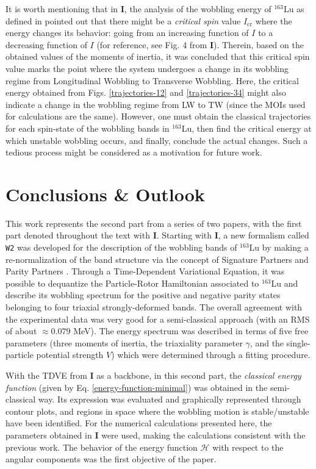 \documentclass[myclassdoc,debug]{rjparticle}
\begin{document}
It is worth mentioning that in \textbf{I}, the analysis of the wobbling energy of $^{163}$Lu as defined in \cite{frauendorf2014transverse} pointed out that there might be a \emph{critical spin} value $I_\text{cr}$ where the energy changes its behavior: going from an increasing function of $I$ to a decreasing function of $I$ (for reference, see Fig. 4 from \textbf{I}). Therein, based on the obtained values of the moments of inertia, it was concluded that this critical spin value marks the point where the system undergoes a change in its wobbling regime from Longitudinal Wobbling to Transverse Wobbling. Here, the critical energy obtained from Figs. \ref{trajectories-12} and \ref{trajectories-34} might also indicate a change in the wobbling regime from LW to TW (since the MOIs used for calculations are the same). However, one must obtain the classical trajectories for each spin-state of the wobbling bands in $^{163}$Lu, then find the critical energy at which unstable wobbling occurs, and finally, conclude the actual changes. Such a tedious process might be considered as a motivation for future work.

\section{Conclusions \& Outlook}
\label{section-gata}

This work represents the second part from a series of two papers, with the first part denoted throughout the text with \textbf{I}. Starting with \textbf{I}, a new formalism called \texttt{W2} was developed for the description of the wobbling bands of $^{163}$Lu by making a re-normalization of the band structure via the concept of Signature Partners and Parity Partners  \cite{poenaru2021parity}. Through a Time-Dependent Variational Equation, it was possible to dequantize the Particle-Rotor Hamiltonian associated to $^{163}$Lu and describe its wobbling spectrum for the positive and negative parity states belonging to four triaxial strongly-deformed bands. The overall agreement with the experimental data was very good for a semi-classical approach (with an RMS of about $\approx0.079$ MeV). The energy spectrum was described in terms of five free parameters (three moments of inertia, the triaxiality parameter $\gamma$, and the single-particle potential strength $V$) which were determined through a fitting procedure. 

With the TDVE from \textbf{I} as a backbone, in this second part, the \emph{classical energy function} (given by Eq. \ref{energy-function-minimal}) was obtained in the semi-classical way. Its expression was evaluated and graphically represented through contour plots, and regions in space where the wobbling motion is stable/unstable have been identified. For the numerical calculations presented here, the parameters obtained in \textbf{I} were used, making the calculations consistent with the previous work. The behavior of the energy function $\mathcal{H}$ with respect to the angular components was the first objective of the paper.
\end{document}
